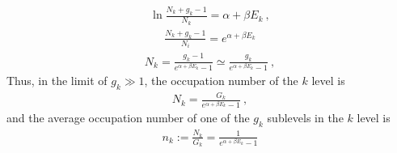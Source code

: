 \documentclass[letterpaper,10pt,english]{jupyterBook}
\begin{document}
\begin{equation*}
\begin{split}\ln \frac{N_k + g_k - 1}{N_k} = \alpha + \beta E_k \ ,\end{split}
\end{equation*}\begin{equation*}
\begin{split}\frac{N_k + g_k - 1}{N_i} = e^{\alpha + \beta E_k}\end{split}
\end{equation*}\begin{equation*}
\begin{split}N_k = \frac{g_k - 1}{e^{\alpha + \beta E_k}-1} \simeq \frac{g_k}{e^{\alpha + \beta E_k}-1} \ , \end{split}
\end{equation*}
\sphinxAtStartPar
Thus, in the limit of \(g_k \gg 1\), the  occupation number of the \(k\) level is
\begin{equation*}
\begin{split}N_k = \frac{G_k}{e^{\alpha + \beta E_k} - 1} \ ,\end{split}
\end{equation*}
\sphinxAtStartPar
and the average occupation number of one of the \(g_k\) sublevels in the \(k\) level is
\begin{equation*}
\begin{split}n_k := \frac{N_k}{G_k} = \frac{1}{e^{\alpha + \beta E_k} - 1}\end{split}
\end{equation*}\subsubsection*{}
\label{ch/statistical-mechanics/notes:example-0}
\end{document}
